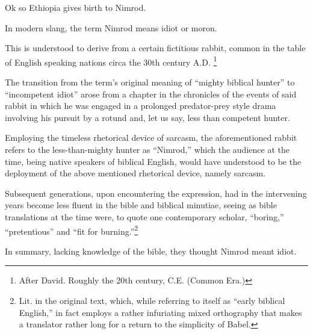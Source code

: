 {
}
{
}
{
Ok so Ethiopia gives birth to Nimrod.

In modern slang, the term Nimrod means idiot or moron.

This is understood to derive from a certain fictitious rabbit,
common in the table of English speaking nations circa the 30th century A.D.%
\footnote{After David. Roughly the 20th century, C.E. (Common Era.)}

The transition from the term's original meaning of ``mighty biblical hunter'' to ``incompetent idiot'' arose from a chapter in the chronicles of the events of said rabbit in which he was engaged in a prolonged predator-prey style drama involving his pursuit by a rotund and, let us say, less than competent hunter.

Employing the timeless rhetorical device of sarcasm, the aforementioned rabbit refers to the less-than-mighty hunter as ``Nimrod,'' which the audience at the time, being native speakers of biblical English, would have understood to be the deployment of the above mentioned rhetorical device, namely sarcasm.

Subsequent generations, upon encountering the expression, had in the intervening years become less fluent in the bible and biblical minutiae, seeing as bible translations at the time were, to quote one contemporary scholar, ``boring,'' ``pretentious'' and ``fit for burning.''\footnote{Lit.  in the original text, which, while referring to itself as ``early biblical English,'' in fact employs a rather infuriating mixed orthography that makes a translator rather long for a return to the simplicity of Babel.}

In summary, lacking knowledge of the bible, they thought Nimrod meant idiot.%

}

